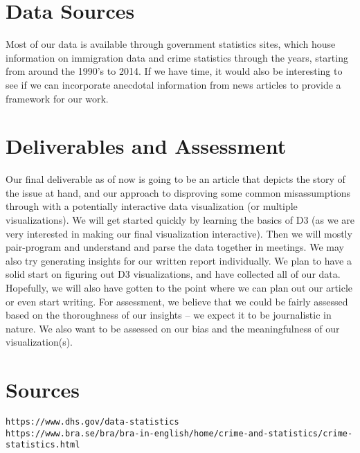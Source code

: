 \documentclass[10pt]{article}
\begin{document}
\section{Data Sources}
	Most of our data is available through government statistics sites, which house information on immigration data and crime statistics through the years, starting from around the 1990’s to 2014. If we have time, it would also be interesting to see if we can incorporate anecdotal information from news articles to provide a framework for our work.
	
\section{Deliverables and Assessment}
	Our final deliverable as of now is going to be an article that depicts the story of the issue at hand, and our approach to disproving some common misassumptions through with a potentially interactive data visualization (or multiple visualizations). We will get started quickly by learning the basics of D3 (as we are very interested in making our final visualization interactive). Then we will mostly pair-program and understand and parse the data together in meetings. We may also try generating insights for our written report individually. We plan to have a solid start on figuring out D3 visualizations, and have collected all of our data. Hopefully, we will also have gotten to the point where we can plan out our article or even start writing. For assessment, we believe that we could be fairly assessed based on the thoroughness of our insights -- we expect it to be journalistic in nature. We also want to be assessed on our bias and the meaningfulness of our visualization(s).
	
\newpage

\section*{Sources}
\texttt{https://www.dhs.gov/data-statistics\\
https://www.bra.se/bra/bra-in-english/home/crime-and-statistics/crime-statistics.html }
\end{document}
